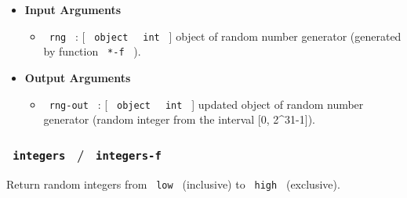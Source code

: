 \begin{Shaded}
\begin{Highlighting}[]
\end{Highlighting}
\end{Shaded}

\begin{itemize}
\item
  \textbf{Input Arguments}

  \begin{itemize}
  \tightlist
  \item
    \texttt{\ rng\ } : {[} \texttt{\ object\ } \textbar{}
    \texttt{\ int\ } {]} object of random number generator (generated by
    function \texttt{\ *-f\ } ).
  \end{itemize}
\item
  \textbf{Output Arguments}

  \begin{itemize}
  \tightlist
  \item
    \texttt{\ rng-out\ } : {[} \texttt{\ object\ } \textbar{}
    \texttt{\ int\ } {]} updated object of random number generator
    (random integer from the interval {[}0, 2\^{}31-1{]}).
  \end{itemize}
\end{itemize}

\subsubsection{\texorpdfstring{\texttt{\ integers\ } /
\texttt{\ integers-f\ }}{ integers  /  integers-f }}\label{integers-integers-f}

Return random integers from \texttt{\ low\ } (inclusive) to
\texttt{\ high\ } (exclusive).

\begin{Shaded}
\begin{Highlighting}[]
\end{Highlighting}
\end{Shaded}

